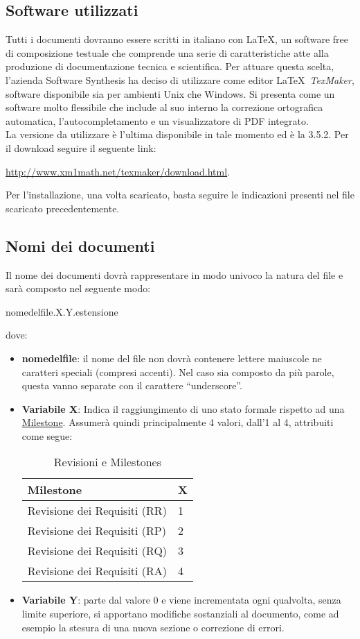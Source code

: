 \subsection{Software utilizzati}
Tutti i documenti dovranno essere scritti in italiano con \LaTeX, un software free di composizione testuale che comprende una serie di caratteristiche atte alla produzione di documentazione tecnica e scientifica.
\newline
Per attuare questa scelta, l'azienda Software Synthesis ha deciso di utilizzare come editor \LaTeX \ \textit{TexMaker}, software disponibile sia per ambienti Unix che Windows. Si presenta come un software molto flessibile che include al suo interno la correzione ortografica automatica, l'autocompletamento e un visualizzatore di PDF integrato.\\
La versione da utilizzare è l'ultima disponibile in tale momento ed è la 3.5.2. Per il download seguire il seguente link:
\begin{center}
\url{http://www.xm1math.net/texmaker/download.html}.
\end{center}
Per l'installazione, una volta scaricato, basta seguire le indicazioni presenti nel file scaricato precedentemente.
\subsection{Nomi dei documenti}
\label{sec:nomi_documenti}
Il nome dei documenti dovrà rappresentare in modo univoco la natura del file e sarà composto nel seguente modo:
\begin{center}
nome\textunderscore del\textunderscore file.X.Y.estensione
\end{center}
dove:
\begin{itemize}
\item \textbf{nome\textunderscore del\textunderscore file}: il nome del file non dovrà contenere lettere maiuscole ne caratteri speciali (compresi accenti). Nel caso sia composto da più parole, questa vanno separate con il carattere ``underscore''.
\item \textbf{Variabile X}: Indica il raggiungimento di uno stato formale rispetto ad una \underline{Milestone}. Assumerà quindi principalmente 4 valori, dall'1 al 4, attribuiti come segue:
\begin{table}[h]
\centering
\begin{tabular}{l|l}
\toprule
Milestone & X\\
\midrule
Revisione dei Requisiti (RR) & 1\\
Revisione dei Requisiti (RP) & 2\\
Revisione dei Requisiti (RQ) & 3\\
Revisione dei Requisiti (RA) & 4\\
\bottomrule
\end{tabular}
\caption{Revisioni e Milestones}
\end{table}
\item \textbf{Variabile Y}: parte dal valore 0 e viene incrementata ogni qualvolta, senza limite superiore, si apportano modifiche sostanziali al documento, come ad esempio la stesura di una nuova sezione o correzione di errori.
\end{itemize}

